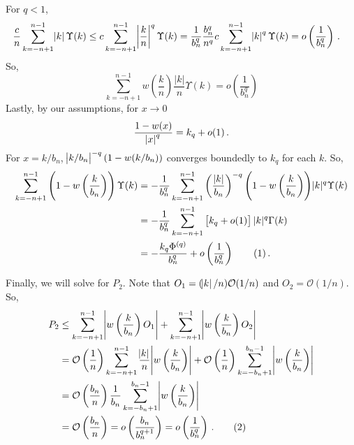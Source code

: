 \documentclass[12pt]{article}
\newcommand\numberthis{\addtocounter{equation}{1}\tag{\theequation}}
\theoremstyle{remark}
\begin{document}
For $q <1$,
\begin{align*}
   \dfrac{c}{n}\sum_{k = -n+1}^{n-1}\abs{k} \Upsilon(k)  &\leq c\sum_{k =-n+1}^{n-1}\abs{\dfrac{k}{n}}^q  \Upsilon(k)  = \dfrac{1}{b_n^q}\dfrac{b_n^q}{n^q} c \sum_{k =-n+1}^{n-1}\abs{k}^q \Upsilon(k)  = o\left(\dfrac{1}{b_n^q}\right) \, .
\end{align*}
So,
\begin{equation}
\label{eq:P1_second}
 \sum_{k = -n+1}^{n-1}w\left(\dfrac{k}{n}\right)\dfrac{|k|}{n}\Upsilon(k) = o \left(\dfrac{1}{b_n^q} \right)
\end{equation}
Lastly, by our assumptions, for $x \to 0$
\[
\dfrac{1 - w(x)}{\abs{x}^q} = k_q + o(1)\,.
\]
For $x = k/b_n$, $\abs{k/b_n}^{-q}(1-w(k/b_n))$ converges boundedly to $k_q$ for each $k$.
So,
\begin{align*}
     \sum_{k = -n+1}^{n-1}\left(1-w\left(\dfrac{k}{b_n}\right)\right)\Upsilon(k) &= -\dfrac{1}{b_n^q}\sum_{k = -n+1}^{n-1}  \left(\dfrac{|k|}{b_n}\right)^{-q} {\left(1-w\left(\dfrac{k}{b_n}\right)\right)}|k|^q \Upsilon(k) \\
     & = -\dfrac{1}{b_n^q}\sum_{k = -n+1}^{n-1}   \left[k_q + o(1) \right]|k|^q \Gamma(k) \\
     & = -\dfrac{k_q \Phi^{(q)} }{b_n^q} + o\left( \dfrac{1}{b_n^q} \right) \numberthis \label{eq:P1_third}\,.
\end{align*}

Finally, we will solve for $P_2$. Note that $O_1 = (\abs{k}/n)\mathcal{O}(1/n)$ and $O_2 = \mathcal{O}(1/n)$. So,
  \begin{align*}
    P_2  & \leq \sum_{k=-n+1}^{n-1}\abs{w\left(\dfrac{k}{b_n}\right)O_1} + \sum_{k=-n+1}^{n-1}\abs{w\left(\dfrac{k}{b_n}\right)O_2} \\
      &= \mathcal{O}\left(\dfrac{1}{n}\right)\sum_{k=-n+1}^{n-1}\dfrac{\abs{k}}{n}\abs{w\left(\dfrac{k}{b_n}\right)} + \mathcal{O}\left(\dfrac{1}{n}\right)\sum_{k=-b_n+1}^{b_n-1}\abs{w\left(\dfrac{k}{b_n}\right)}\\
      &= \mathcal{O}\left(\dfrac{b_n}{n}\right)\dfrac{1}{b_n} \sum_{k=-b_n+1}^{b_n-1}\abs{w\left(\dfrac{k}{b_n}\right)}\\
      &= \mathcal{O}\left(\dfrac{b_n}{n}\right) = o\left(\dfrac{b_n}{b_n^{q+1}}\right) = o\left(\dfrac{1}{b_n^{q}}\right) \,. \numberthis \label{eq:P_2}
 \end{align*}
 
\end{document}
